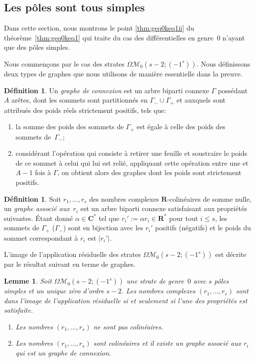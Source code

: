 \documentclass[JEP,XML,SOM,Unicode,francais,NoFloatCountersInSection,published]{cedram}
\let\mathcal\mathscr
\newenvironment{enumeratei}
{\bgroup\def\theenumi{\roman{enumi}}\def\theenumii{\arabic{enumii}}\begin{enumerate}}
{\end{enumerate}\egroup}
\newcommand{\RR}{\mathbf{R}}
\newcommand{\CC}{\mathbf{C}}
\newcommand{\omoduli}[1][g]{{\Omega\mathcal M}_{\!#1}}
\newtheorem{lem}[thm]{Lemme}
\theoremstyle{definition}
\newtheorem{defn}[thm]{Définition}
\begin{document}
\subsection{Les pôles sont tous simples}
\label{sec:caslier}
Dans cette section, nous montrons le point \eqref{thm:geq0keq1ii} du théorème~\ref{thm:geq0keq1} qui traite du cas des différentielles en genre~$0$ n'ayant que des pôles simples.

Nous commençons par le cas des strates $\omoduli[0](s-2;(-1^{s}))$. Nous définissons deux types de graphes que nous utilisons de manière essentielle dans la preuve.

\begin{defn}\label{def:grapheconnexion}
Un \emph{graphe de connexion} est un arbre biparti connexe $\Gamma$ possédant~$A$ arêtes, dont les sommets sont partitionnés en $\Gamma_{-}\cup\Gamma_{+}$ et auxquels sont attribués des poids réels strictement positifs, tels que:
\begin{enumeratei}
\item\label{def:grapheconnexioni} la somme des poids des sommets de $\Gamma_{+}$ est égale à celle des poids des sommets de~$\Gamma_{-}$;
\item\label{def:grapheconnexionii} considérant l'opération qui consiste à retirer une feuille et soustraire le poids de ce sommet à celui qui lui est relié, appliquant cette opération entre une et $A-1$ fois à $\Gamma$, on obtient alors des graphes dont les poids sont strictement positifs.
\end{enumeratei}
\end{defn}

\begin{defn}
Soit $r_{1},\dots,r_{s}$ des nombres complexes $\RR$-colinéaires de somme nulle, un \emph{graphe associé aux~$r_{i}$} est un arbre biparti connexe satisfaisant aux propriétés suivantes. Étant donné $\alpha\in\CC^{\ast}$ tel que $r_{i}':=\alpha r_{i}\in\RR^{\ast}$ pour tout $i\leq s$, les sommets de $\Gamma_{+}$ (\resp $\Gamma_{-}$) sont en bijection avec les $r_{i}'$ positifs (\resp négatifs) et le poids du sommet correspondant à $r_{i}$ est $|r_{i}'|$.
\end{defn}

L'image de l'application résiduelle des strates $\omoduli[0](s-2;(-1^{s}))$ est décrite par le résultat suivant en terme de graphes.
\begin{lem}\label{lem:gzeropolesimples}
Soit $\omoduli[0](s-2;(-1^{s}))$ une strate de genre~$0$ avec $s$ pôles simples et un unique zéro d'ordre $s-2$. Les nombres complexes $(r_{1},\ldots,r_{s})$ sont dans l'image de l'application résiduelle si et seulement si
l'une des propriétés est satisfaite.
\begin{enumerate}
\item\label{lem:gzeropolesimples1} Les nombres $(r_{1},\ldots,r_{s})$ ne sont pas colinéaires.
\item\label{lem:gzeropolesimples2} Les nombres $(r_{1},\ldots,r_{s})$ sont colinéaires et il existe un graphe associé aux $r_{i}$ qui est un graphe de connexion.
\end{enumerate}
\end{lem}
\end{document}
